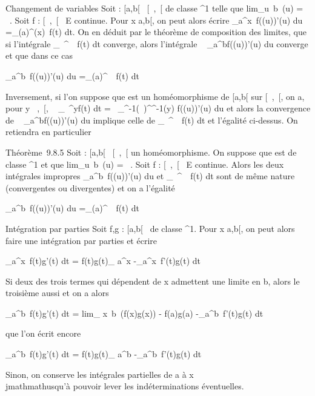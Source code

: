 \documentclass[]{article}
\begin{document}
Changement de variables Soit \phi : {[}a,b{[}\rightarrow~ {[}\alpha~,\beta~{[} de classe
^1 telle que lim_u\rightarrow~b~\phi(u)
= \beta~. Soit f : {[}\alpha~,\beta~{[}\rightarrow~ E continue. Pour x \in {[}a,b{[}, on peut alors
écrire \int  _a^x~f(\phi(u))\phi'(u) du
=\int  _\phi(a)^\phi(x)~f(t) dt. On en
déduit par le théorème de composition des limites, que si l'intégrale
\int  _\alpha~^\beta~~f(t) dt converge, alors
l'intégrale \int ~
_a^bf(\phi(u))\phi'(u) du converge et que dans ce cas

\int  _a^b~f(\phi(u))\phi'(u) du
=\int  _\phi(a)^\beta~~f(t) dt

Inversement, si l'on suppose que \phi est un homéomorphisme de {[}a,b{[}
sur {[}\alpha~,\beta~{[}, on a, pour y \in {[}\alpha~,\beta~{[}, \int ~
_\alpha~^yf(t) dt =\int ~
_\phi^-1(\alpha~)^\phi^-1(y) f(\phi(u))\phi'(u) du et
alors la convergence de \int ~
_a^bf(\phi(u))\phi'(u) du implique celle de
\int  _\alpha~^\beta~~f(t) dt et l'égalité
ci-dessus. On retiendra en particulier

Théorème~9.8.5 Soit \phi : {[}a,b{[}\rightarrow~ {[}\alpha~,\beta~{[} un homéomorphisme. On
suppose que \phi est de classe ^1 et que
lim_u\rightarrow~b~\phi(u) = \beta~. Soit f : {[}\alpha~,\beta~{[}\rightarrow~
E continue. Alors les deux intégrales impropres
\int  _a^b~f(\phi(u))\phi'(u) du et
\int  _\alpha~^\beta~~f(t) dt sont de même
nature (convergentes ou divergentes) et on a l'égalité

\int  _a^b~f(\phi(u))\phi'(u) du
=\int  _\phi(a)^\beta~~f(t) dt

Intégration par parties Soit f,g : {[}a,b{[}\rightarrow~  de classe
^1. Pour x \in {[}a,b{[}, on peut alors faire une intégration
par parties et écrire

\int  _a^x~f(t)g'(t) dt =
\left {[}f(t)g(t)\right {]}_
a^x -\int  _a^x~f'(t)g(t)
dt

Si deux des trois termes qui dépendent de x admettent une limite en b,
alors le troisième aussi et on a alors

\int  _a^b~f(t)g'(t) dt
= lim_ x\rightarrow~b~(f(x)g(x)) - f(a)g(a)
-\int  _a^b~f'(t)g(t) dt

que l'on écrit encore

\int  _a^b~f(t)g'(t) dt =
\left {[}f(t)g(t)\right {]}_
a^b -\int  _a^b~f'(t)g(t)
dt

Sinon, on conserve les intégrales partielles de a à x \\jmathmathusqu'à pouvoir
lever les indéterminations éventuelles.
\end{document}
